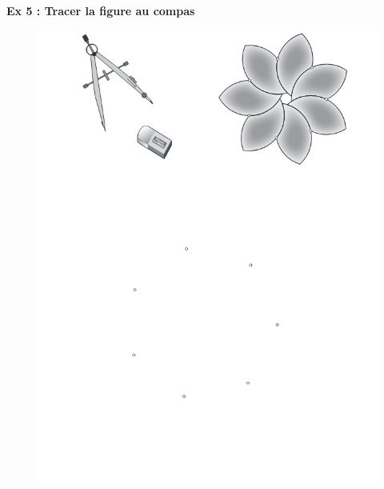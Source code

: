 \newpage
\textbf{Ex 5 : Tracer la figure au compas}

\begin{figure}[H]
  \centering
  \includegraphics[width=0.9\linewidth]{6x4-symetrie/ex5.png}
\end{figure}

